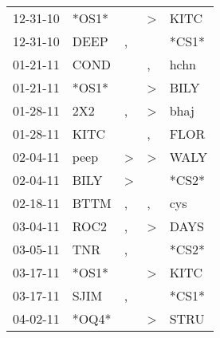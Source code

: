 \begin{supertabular}{p{0.07\textwidth}p{0.06\textwidth}p{0.02\textwidth}p{0.02\textwidth}p{0.06\textwidth}}
          12-31-10\textsuperscript{} &                            *OS1* &                  &     \textgreater &           KITC\textsuperscript{} \\
          12-31-10\textsuperscript{} &           DEEP\textsuperscript{} &                , &                  &                            *CS1* \\
          01-21-11\textsuperscript{} &           COND\textsuperscript{} &                  &                , &           hchn\textsuperscript{} \\
          01-21-11\textsuperscript{} &                            *OS1* &                  &     \textgreater &           BILY\textsuperscript{} \\
          01-28-11\textsuperscript{} &            2X2\textsuperscript{} &                , &     \textgreater &           bhaj\textsuperscript{} \\
          01-28-11\textsuperscript{} &           KITC\textsuperscript{} &                  &                , &           FLOR\textsuperscript{} \\
          02-04-11\textsuperscript{} &           peep\textsuperscript{} &     \textgreater &     \textgreater &           WALY\textsuperscript{} \\
          02-04-11\textsuperscript{} &           BILY\textsuperscript{} &     \textgreater &                  &                            *CS2* \\
          02-18-11\textsuperscript{} &           BTTM\textsuperscript{} &                , &                , &            cys\textsuperscript{} \\
          03-04-11\textsuperscript{} &           ROC2\textsuperscript{} &                , &     \textgreater &           DAYS\textsuperscript{} \\
          03-05-11\textsuperscript{} &            TNR\textsuperscript{} &                , &                  &                            *CS2* \\
          03-17-11\textsuperscript{} &                            *OS1* &                  &     \textgreater &           KITC\textsuperscript{} \\
          03-17-11\textsuperscript{} &           SJIM\textsuperscript{} &                , &                  &                            *CS1* \\
          04-02-11\textsuperscript{} &                            *OQ4* &                  &     \textgreater &           STRU\textsuperscript{} \\

\end{supertabular}
